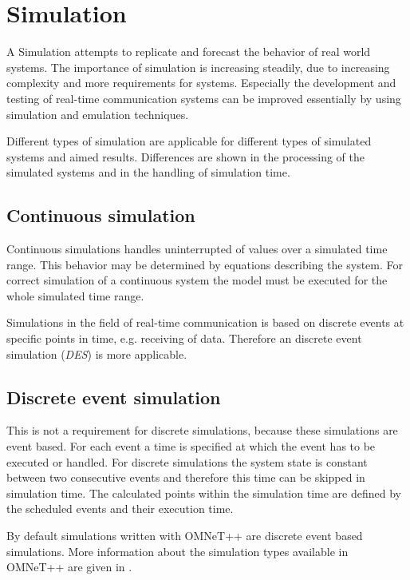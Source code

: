 \chapter{Simulation}
\label{cha:simulation}

A Simulation attempts to replicate and forecast the behavior of real world systems.
The importance of simulation is increasing steadily, due to increasing complexity and more requirements for systems.
Especially the development and testing of real-time communication systems can be improved essentially by using simulation and emulation techniques.

Different types of simulation are applicable for different types of simulated systems and aimed results.
Differences are shown in the processing of the simulated systems and in the handling of simulation time.
\cite[section 1.2]{mchaney2009understanding}

\section{Continuous simulation}
\label{sec:simulation_cont}
Continuous simulations handles uninterrupted of values over a simulated time range.
This behavior may be determined by equations describing the system.
For correct simulation of a continuous system the model must be executed for the whole simulated time range. \cite[section 1.2.1]{mchaney2009understanding}

Simulations in the field of real-time communication is based on discrete events at specific points in time, e.g. receiving of data.
Therefore an discrete event simulation (\emph{DES}) is more applicable.

\section{Discrete event simulation}
\label{sec:simulation_event}


This is not a requirement for discrete simulations, because these simulations are event based.
For each event a time is specified at which the event has to be executed or handled.
For discrete simulations the system state is constant between two consecutive events and therefore this time can be skipped in simulation time.
The calculated points within the simulation time are defined by the scheduled events and their execution time.

By default simulations written with OMNeT++ are discrete event based simulations.
More information about the simulation types available in OMNeT++ are given in \cite[section 4.1]{omnet_manual}.

